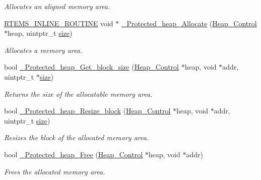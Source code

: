 \begin{DoxyCompactItemize}
\begin{DoxyCompactList}\small\item\em Allocates an aligned memory area. \end{DoxyCompactList}\item 
\mbox{\hyperlink{group__RTEMSScoreBaseDefs_gac216239df231d5dbd15e3520b0b9313f}{R\+T\+E\+M\+S\+\_\+\+I\+N\+L\+I\+N\+E\+\_\+\+R\+O\+U\+T\+I\+NE}} void $\ast$ \mbox{\hyperlink{group__RTEMSScoreProtHeap_gab7cdb2ee3416572258caab80416e312a}{\+\_\+\+Protected\+\_\+heap\+\_\+\+Allocate}} (\mbox{\hyperlink{structHeap__Control}{Heap\+\_\+\+Control}} $\ast$heap, uintptr\+\_\+t \mbox{\hyperlink{sun4u_2tte_8h_a245260f6f74972558f61b85227df5aae}{size}})
\begin{DoxyCompactList}\small\item\em Allocates a memory area. \end{DoxyCompactList}\item 
bool \mbox{\hyperlink{group__RTEMSScoreProtHeap_ga8b33f6ca130ff4c89c97e318f0f5d347}{\+\_\+\+Protected\+\_\+heap\+\_\+\+Get\+\_\+block\+\_\+size}} (\mbox{\hyperlink{structHeap__Control}{Heap\+\_\+\+Control}} $\ast$heap, void $\ast$addr, uintptr\+\_\+t $\ast$\mbox{\hyperlink{sun4u_2tte_8h_a245260f6f74972558f61b85227df5aae}{size}})
\begin{DoxyCompactList}\small\item\em Returns the size of the allocatable memory area. \end{DoxyCompactList}\item 
bool \mbox{\hyperlink{group__RTEMSScoreProtHeap_ga44f1fdece094ff00c7e0fdbafa22918d}{\+\_\+\+Protected\+\_\+heap\+\_\+\+Resize\+\_\+block}} (\mbox{\hyperlink{structHeap__Control}{Heap\+\_\+\+Control}} $\ast$heap, void $\ast$addr, uintptr\+\_\+t \mbox{\hyperlink{sun4u_2tte_8h_a245260f6f74972558f61b85227df5aae}{size}})
\begin{DoxyCompactList}\small\item\em Resizes the block of the allocated memory area. \end{DoxyCompactList}\item 
bool \mbox{\hyperlink{group__RTEMSScoreProtHeap_gabfcf102ec8b1ec0fa0f620ce3694722b}{\+\_\+\+Protected\+\_\+heap\+\_\+\+Free}} (\mbox{\hyperlink{structHeap__Control}{Heap\+\_\+\+Control}} $\ast$heap, void $\ast$addr)
\begin{DoxyCompactList}\small\item\em Frees the allocated memory area. \end{DoxyCompactList}\item 

\end{DoxyCompactItemize}
